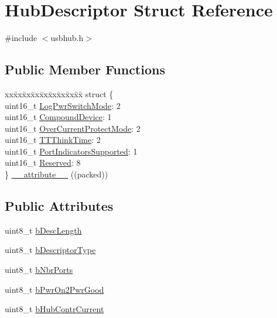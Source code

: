 \hypertarget{struct_hub_descriptor}{\section{\-Hub\-Descriptor \-Struct \-Reference}
\label{struct_hub_descriptor}
}


{\ttfamily \#include $<$usbhub.\-h$>$}

\subsection*{\-Public \-Member \-Functions}
\begin{DoxyCompactItemize}
\item 
\begin{tabbing}
xx\=xx\=xx\=xx\=xx\=xx\=xx\=xx\=xx\=\kill
struct \{\\
\>uint16\_t \hyperlink{struct_hub_descriptor_a68084f6fd86bff9598573ac845be6fe3}{LogPwrSwitchMode}: 2\\
\>uint16\_t \hyperlink{struct_hub_descriptor_a3547643d0dfd8f16145229c530a8c1a5}{CompoundDevice}: 1\\
\>uint16\_t \hyperlink{struct_hub_descriptor_a0ac02abaa7e8aeec5f1520a58c9eecb3}{OverCurrentProtectMode}: 2\\
\>uint16\_t \hyperlink{struct_hub_descriptor_a00002f5db3d923aa11645bfde3cd650e}{TTThinkTime}: 2\\
\>uint16\_t \hyperlink{struct_hub_descriptor_a6478c259c7397e89d50b42f6f3d4f4e4}{PortIndicatorsSupported}: 1\\
\>uint16\_t \hyperlink{struct_hub_descriptor_a0c3292fe67fdbdab6ceac8b198ef44bf}{Reserved}: 8\\
\} \hyperlink{struct_hub_descriptor_a190834a0bc01fe156cf32ae292b1a8e8}{\_\_attribute\_\_} ((packed))\\

\end{tabbing}\end{DoxyCompactItemize}
\subsection*{\-Public \-Attributes}
\begin{DoxyCompactItemize}
\item 
uint8\-\_\-t \hyperlink{struct_hub_descriptor_a8d761880b0fe752c395538bc0976f041}{b\-Desc\-Length}
\item 
uint8\-\_\-t \hyperlink{struct_hub_descriptor_a8f613e53b85930830679201aeb8a4024}{b\-Descriptor\-Type}
\item 
uint8\-\_\-t \hyperlink{struct_hub_descriptor_a8519ab446f0bdb69c33cd89b553da30b}{b\-Nbr\-Ports}
\item 
uint8\-\_\-t \hyperlink{struct_hub_descriptor_a670882df710639db15249ee9a956b664}{b\-Pwr\-On2\-Pwr\-Good}
\item 
uint8\-\_\-t \hyperlink{struct_hub_descriptor_a454ce905f8af25625156fbeb729d53b7}{b\-Hub\-Contr\-Current}
\end{DoxyCompactItemize}



